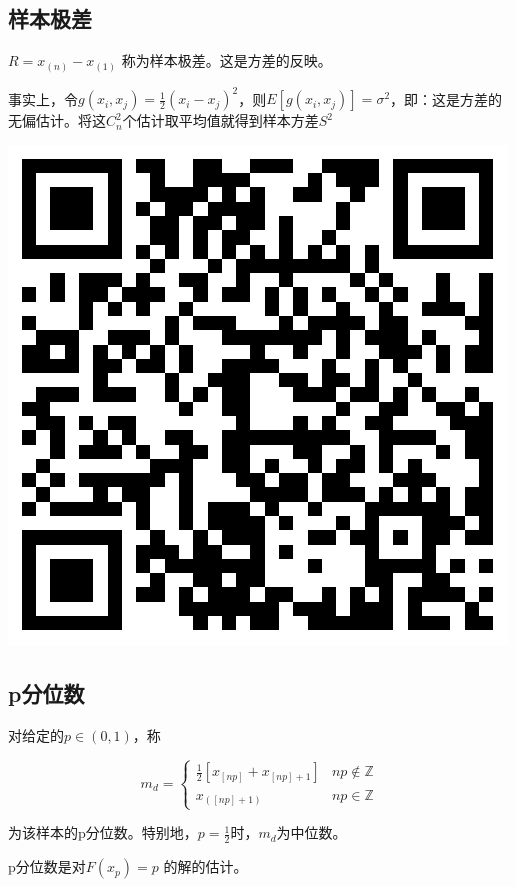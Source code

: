 \documentclass[UTF-8]{ctexbeamer}
\begin{document}
\subsection{样本极差}
\begin{frame}
  $R=x_{(n)}-x_{(1)}$ 称为样本极差。这是方差的反映。

  事实上，令$g(x_i,x_j)=\frac{1}{2}(x_i-x_j)^2$，则$E[g(x_i,x_j)]=\sigma^2$，即：这是方差的无偏估计。将这$C_n^2$个估计取平均值就得到样本方差$S^2$

  \includegraphics[scale=0.3]{proof_of_average.png}
\end{frame}

\subsection{p分位数}
\begin{frame}
  对给定的$p\in(0,1)$，称

$$
m_d=
\begin{cases}
\frac{1}{2}[x_{[np]}+x_{[np]+1}] &np\not\in \mathbb{Z}\\
x_{([np]+1)}& np\in \mathbb{Z}
\end{cases}
$$

为该样本的p分位数。特别地，$p=\frac{1}{2}$时，$m_d$为中位数。

p分位数是对$F(x_p)=p$ 的解的估计。
\end{frame}
\end{document}
